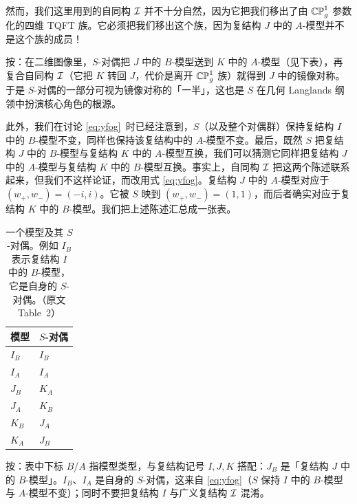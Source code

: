 然而，我们这里用到的自同构 ${\EUI}$ 并不十分自然，因为它把我们移出了由 $\Bbb{CP}^1_g$ 参数化的四维 TQFT 族。它必须把我们移出这个族，因为复结构 $J$ 中的 $A$-模型并不是这个族的成员！

\begin{yizhu}[物理图像]
按：在二维图像里，$S$-对偶把 $J$ 中的 $B$-模型送到 $K$ 中的 $A$-模型（见下表），再复合自同构 ${\EUI}$（它把 $K$ 转回 $J$，代价是离开 $\Bbb{CP}^1_g$ 族）就得到 $J$ 中的镜像对称。于是 $S$-对偶的一部分可视为镜像对称的「一半」，这也是 $S$ 在几何 Langlands 纲领中扮演核心角色的根源。
\end{yizhu}

此外，我们在讨论 \eqref{eq:yfog}\ 时已经注意到，$S$（以及整个对偶群）保持复结构 $I$ 中的 $B$-模型不变，同样也保持该复结构中的 $A$-模型不变。最后，既然 $S$ 把复结构 $J$ 中的 $B$-模型与复结构 $K$ 中的 $A$-模型互换，我们可以猜测它同样把复结构 $J$ 中的 $A$-模型与复结构 $K$ 中的 $B$-模型互换。事实上，自同构 ${\EUI}$ 把这两个陈述联系起来，但我们不这样论证，而改用式 \eqref{eq:yfog}。复结构 $J$ 中的 $A$-模型对应于 $(w_+,w_-)=(-i,i)$。它被 $S$ 映到 $(w_+,w_-)=(1,1)$，而后者确实对应于复结构 $K$ 中的 $B$-模型。我们把上述陈述汇总成一张表。

\par\medskip

\begin{table}[htbp]
\centering
\begin{tabular}{ll}
\toprule
模型 & $S$-对偶 \\
\midrule
$I_B$ & $I_B$ \\
$I_A$ & $I_A$ \\
$J_B$ & $K_A$ \\
$J_A$ & $K_B$ \\
$K_B$ & $J_A$ \\
$K_A$ & $J_B$ \\
\bottomrule
\end{tabular}
\caption{一个模型及其 $S$-对偶。例如 $I_B$ 表示复结构 $I$ 中的 $B$-模型，它是自身的 $S$-对偶。（原文 Table~2）}
\label{tab:sdual-models}
\end{table}

\begin{yizhu}[易错点]
按：表中下标 $B$/$A$ 指模型类型，与复结构记号 $I,J,K$ 搭配：$J_B$ 是「复结构 $J$ 中的 $B$-模型」。$I_B$、$I_A$ 是自身的 $S$-对偶，这来自 \eqref{eq:yfog}（$S$ 保持 $I$ 中的 $B$-模型与 $A$-模型不变）；同时不要把复结构 $I$ 与广义复结构 ${\cal I}$ 混淆。
\end{yizhu}
